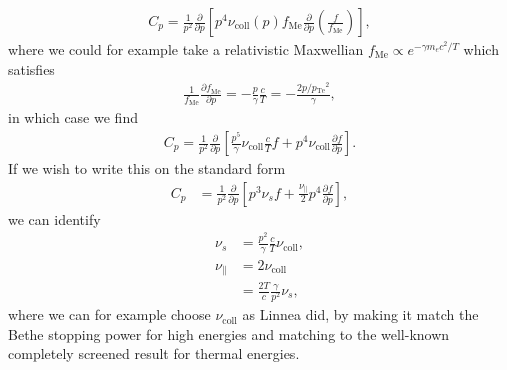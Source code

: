 \documentclass[11pt,a4paper]{article}
\newcommand{\sub}[1]{\ensuremath{_{\text{#1}}}}
\begin{document}
\begin{align}
C_p = \frac{1}{p^2}\frac{\partial}{\partial p} \left[ p^4 \nu\sub{coll}(p) f\sub{Me}\frac{\partial}{\partial p}\left(\frac{f}{f\sub{Me}}\right)\right],
\end{align}
where we could for example take a relativistic Maxwellian $f\sub{Me}\propto e^{-\gamma  m_e c^2/T}$ which satisfies 
\begin{align}
\frac{1}{f\sub{Me}}\frac{\partial f\sub{Me}}{\partial p} = -\frac{p}{\gamma}\frac{c}{T} = -\frac{2 p/p\sub{Te}^2}{\gamma}, 
\end{align}
in which case we find
\begin{align}
C_p = \frac{1}{p^2}\frac{\partial}{\partial p} \left[ \frac{p^5}{\gamma}\nu\sub{coll} \frac{c}{T} f  + p^4 \nu\sub{coll} \frac{\partial f}{\partial p}\right].
\end{align}
If we wish to write this on the standard form
\begin{align}
C_p &=\frac{1}{p^2}\frac{\partial}{\partial p} \left[ p^3\nu_s f + \frac{\nu_\parallel}{2}p^4\frac{\partial f}{\partial p}\right],
\end{align}
we can identify
\begin{align}
\nu_s &= \frac{p^2}{\gamma} \frac{c}{T}\nu\sub{coll}, \nonumber \\
\nu_\parallel &= 2\nu\sub{coll} \nonumber \\
&= \frac{2T}{c}\frac{\gamma}{p^2}\nu_s,
\end{align}
where we can for example choose $\nu\sub{coll}$ as Linnea did, by making it match the Bethe stopping power for high energies and matching to the well-known completely screened result for thermal energies.
\end{document}

